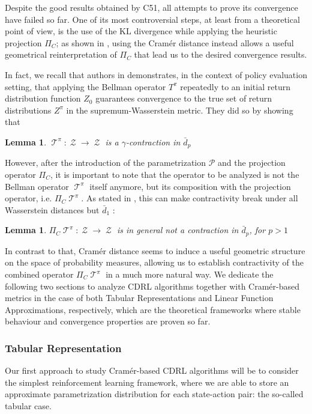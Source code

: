 \documentclass[12pt,a4paper,openright,twoside]{article}
\DeclareMathOperator*{\T}{\mathcal{T}}
\DeclareMathOperator*{\Z}{\mathcal{Z}}
\numberwithin{equation}{section}
\newtheorem{lemma}[theorem]{Lemma}
\theoremstyle{definition}
\theoremstyle{remark}
\theoremstyle{plain}
\begin{document}
Despite the good results obtained by C51, all attempts to prove its convergence have failed so far. One of its most controversial steps, at least from a theoretical point of view, is the use of the KL divergence while applying the heuristic projection $\Pi_{C}$; as shown in \cite{analysisC51}, using the Cramér distance instead allows a useful geometrical reinterpretation of $\Pi_{C}$ that lead us to the desired convergence results.

In fact, we recall that authors in \cite{DRL} demonstrates, in the context of policy evaluation setting, that applying the Bellman operator $T^{\pi}$ repeatedly to an initial return distribution function $Z_0$ guarantees convergence to the true set of return distributions $Z^\pi$ in the supremum-Wasserstein metric. They did so by showing that
\begin{lemma} \label{contractiondp}
	$\T^\pi : \Z \rightarrow \Z$ is a $\gamma$-contraction in $\bar{d}_p$
\end{lemma}

However, after the introduction of the parametrization $\mathcal{P}$ and the projection operator $\Pi_C$, it is important to note that the operator to be analyzed is not the Bellman operator $\T^\pi$ itself anymore, but its composition with the projection operator, i.e. $\Pi_C \T^\pi$. As stated in \cite{analysisC51}, this can make contractivity break under all Wasserstein distances but $\bar{d}_1$ :
\begin{lemma} \label{nocontractiondp}
	$\Pi_C \T^\pi : \Z \rightarrow \Z$ is in general not a contraction in $\bar{d}_p$, for $p>1$
\end{lemma}

In contrast to that, Cramér distance seems to induce a useful geometric structure on the space of probability measures, allowing us to establish contractivity of the combined operator $\Pi_C \T^\pi$ in a much more natural way. We dedicate the following two sections to analyze CDRL algorithms together with Cramér-based metrics in the case of both Tabular Representations and Linear Function Approximations, respectively, which are the theoretical frameworks where stable behaviour and convergence properties are proven so far.


\subsubsection{Tabular Representation} \label{CDRLtabular}

Our first approach to study Cramér-based CDRL algorithms will be to consider the simplest reinforcement learning framework, where we are able to store an approximate parametrization distribution for each state-action pair: the so-called tabular case.
\end{document}
